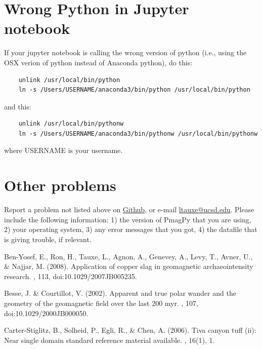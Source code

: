 \documentclass[11pt]{book}
\begin{document}
{{\section{Wrong Python in Jupyter notebook}

If your jupyter notebook is calling the wrong version of python (i.e., using the OSX verion of python instead of Anaconda python), do this:

\begin{verbatim}
    unlink /usr/local/bin/python
    ln -s /Users/USERNAME/anaconda3/bin/python /usr/local/bin/python

\end{verbatim}
    and this:

\begin{verbatim}
    unlink /usr/local/bin/pythonw
    ln -s /Users/USERNAME/anaconda3/bin/pythonw /usr/local/bin/pythonw
\end{verbatim}

where USERNAME is your username.

\section{Other problems}Report a problem not listed above on \href{https://github.com/PmagPy/PmagPy/issues/new}{Github}, or e-mail \href{mailto:ltauxe@ucsd.edu}{ltauxe@ucsd.edu}. Please include the following information: 1) the version of PmagPy that you are using, 2) your operating system, 3) any error messages that you got, 4) the datafile that is giving trouble, if relevant.



\begin{thebibliography}{}

Ben-Yosef, E., Ron, H., Tauxe, L., Agnon, A., Genevey, A., Levy, T., Avner, U.,
  \& Najjar, M. (2008).
\newblock Application of copper slag in geomagnetic archaeointensity research.
, 113, doi:10.1029/2007JB005235.

Besse, J. \& Courtillot, V. (2002).
\newblock Apparent and true polar wander and the geometry of the geomagnetic
  field over the last 200 myr.
, 107, doi:10.1029/2000JB000050.

Carter-Stiglitz, B., Solheid, P., Egli, R., \& Chen, A. (2006).
\newblock Tiva canyon tuff (ii): Near single domain standard reference material
  available.
, 16(1), 1.


\end{thebibliography}}}
\end{document}
